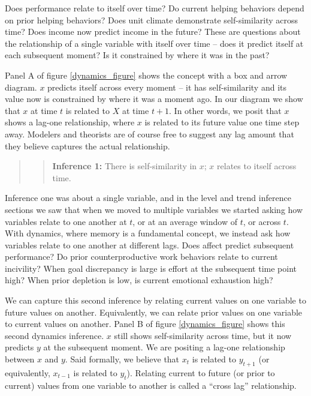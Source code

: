 \documentclass[english,,man]{apa6}
\theoremstyle{definition}
\theoremstyle{definition}
\theoremstyle{definition}
\theoremstyle{remark}
\begin{document}
Does performance relate to itself over time? Do current helping
behaviors depend on prior helping behaviors? Does unit climate
demonstrate self-similarity across time? Does income now predict income
in the future? These are questions about the relationship of a single
variable with itself over time -- does it predict itself at each
subsequent moment? Is it constrained by where it was in the past?

Panel A of figure \ref{dynamics_figure} shows the concept with a box and
arrow diagram. \(x\) predicts itself across every moment -- it has
self-similarity and its value now is constrained by where it was a
moment ago. In our diagram we show that \(x\) at time \(t\) is related
to \(X\) at time \(t + 1\). In other words, we posit that \(x\) shows a
lag-one relationship, where \(x\) is related to its future value one
time step away. Modelers and theorists are of course free to suggest any
lag amount that they believe captures the actual relationship.

\begin{quote}
\begin{quote}
\textbf{Inference 1:} There is self-similarity in \(x\); \(x\) relates
to itself across time.
\end{quote}
\end{quote}

Inference one was about a single variable, and in the level and trend
inference sections we saw that when we moved to multiple variables we
started asking how variables relate to one another at \(t\), or at an
average window of \(t\), or across \(t\). With dynamics, where memory is
a fundamental concept, we instead ask how variables relate to one
another at different lags. Does affect predict subsequent performance?
Do prior counterproductive work behaviors relate to current incivility?
When goal discrepancy is large is effort at the subsequent time point
high? When prior depletion is low, is current emotional exhaustion high?

We can capture this second inference by relating current values on one
variable to future values on another. Equivalently, we can relate prior
values on one variable to current values on another. Panel B of figure
\ref{dynamics_figure} shows this second dynamics inference. \(x\) still
shows self-similarity across time, but it now predicts \(y\) at the
subsequent moment. We are positing a lag-one relationship between \(x\)
and \(y\). Said formally, we believe that \(x_t\) is related to
\(y_{t+1}\) (or equivalently, \(x_{t-1}\) is related to \(y_{t}\)).
Relating current to future (or prior to current) values from one
variable to another is called a \enquote{cross lag} relationship.
\end{document}
